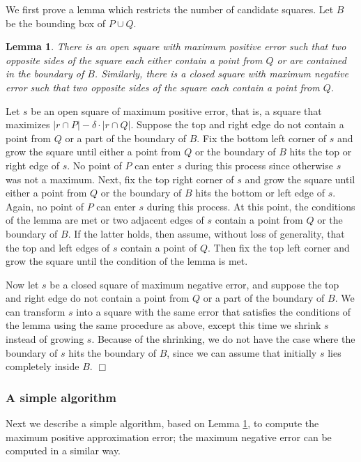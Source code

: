 \documentclass{elsart}
\newtheorem{lemma}[definition]{Lemma}
\newenvironment{proof}{{\bf Proof:} \rm}{\hfill $\Box$ \medskip\\}
\begin{document}
We first prove a lemma which restricts the number of candidate
squares. Let $B$ be the bounding box of $P\cup Q$.
\begin{lemma}\label{le:squares}
There is an open square with maximum positive error such that two
opposite sides of the square each either contain a point from $Q$ or
are contained in the boundary of $B$.
Similarly, there is a closed square with maximum negative error such that two
opposite sides of the square each contain a point from $Q$.
\end{lemma}
\begin{proof}
Let $s$ be an open square of maximum positive error, that is, a square
that maximizes $|r \cap P| - \delta \cdot |r \cap Q|$. Suppose the top
and right edge do not contain a point from $Q$ or a part of the boundary of
$B$. Fix the bottom left corner of $s$ and grow the square until
either a point from $Q$ or the boundary of $B$ hits the top or right
edge of $s$. No point of $P$ can enter $s$ during this process since
otherwise $s$ was not a maximum. Next, fix the top right corner of $s$
and grow the square until either a point from $Q$ or the boundary of
$B$ hits the bottom or left edge of $s$. Again, no point of $P$ can
enter $s$ during this process. At this point, the conditions of the
lemma are met or two adjacent edges of $s$ contain a point from $Q$ or
the boundary of $B$. If the latter holds, then assume, without loss of
generality, that the top and left edges of $s$ contain a point of
$Q$. Then fix the top left corner and grow the square until the
condition of the lemma is met.

Now let $s$ be a closed square of maximum negative error, and suppose
the top and right edge do not contain a point from $Q$ or a part of
the boundary of $B$. We can transform $s$ into a square with the same
error that satisfies the conditions of the lemma using the same
procedure as above, except this time we shrink $s$ instead of growing
$s$. Because of the shrinking, we do not have the case where the
boundary of $s$ hits the boundary of $B$, since we can assume that
initially $s$ lies completely inside $B$.  
\end{proof}


 \subsubsection{A simple algorithm}
Next we describe a simple algorithm, based on Lemma \ref{le:squares},
to compute the maximum positive approximation error;
the maximum negative error can be computed in a similar way.
\end{document}
